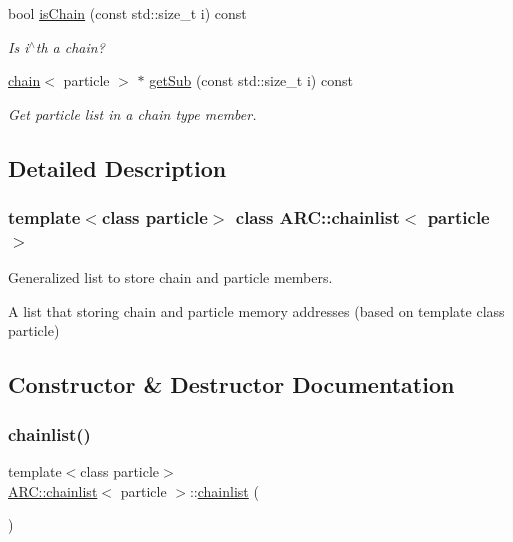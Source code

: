 \begin{DoxyCompactItemize}
bool \hyperlink{classARC_1_1chainlist_a192f6db3659e5329d137de18c8c4b029}{is\+Chain} (const std\+::size\+\_\+t i) const
\begin{DoxyCompactList}\small\item\em Is i$^\wedge$th a chain? \end{DoxyCompactList}\item 
\hyperlink{classARC_1_1chain}{chain}$<$ particle $>$ $\ast$ \hyperlink{classARC_1_1chainlist_a14c6b75c2d3e97cf9babcac2aa014e8a}{get\+Sub} (const std\+::size\+\_\+t i) const
\begin{DoxyCompactList}\small\item\em Get particle list in a chain type member. \end{DoxyCompactList}\end{DoxyCompactItemize}


\subsection{Detailed Description}
\subsubsection*{template$<$class particle$>$\newline
class A\+R\+C\+::chainlist$<$ particle $>$}

Generalized list to store chain and particle members. 

A list that storing chain and particle memory addresses (based on template class particle) 

\subsection{Constructor \& Destructor Documentation}
\hypertarget{classARC_1_1chainlist_ab4e3b53aee12e8970d94e1b368088bfa}{}\label{classARC_1_1chainlist_ab4e3b53aee12e8970d94e1b368088bfa} 
\subsubsection{\texorpdfstring{chainlist()}{chainlist()}\hspace{0.1cm}{\footnotesize\ttfamily [1/2]}}
{\footnotesize\ttfamily template$<$class particle$>$ \\
\hyperlink{classARC_1_1chainlist}{A\+R\+C\+::chainlist}$<$ particle $>$\+::\hyperlink{classARC_1_1chainlist}{chainlist} (\begin{DoxyParamCaption}{ }\end{DoxyParamCaption})\hspace{0.3cm}{\ttfamily [inline]}}



